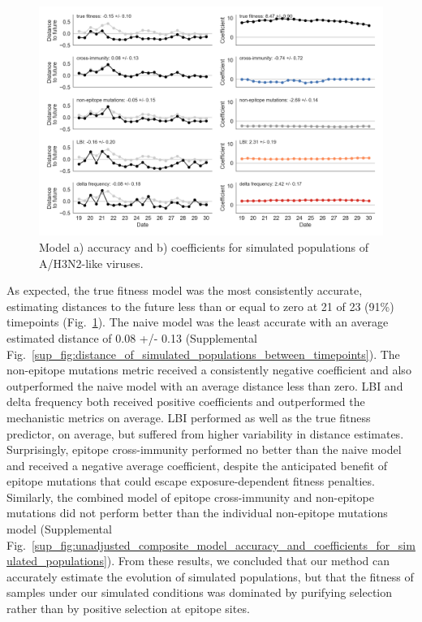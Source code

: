 \begin{figure}[t]
  \begin{center}
  \includegraphics[width=\textwidth]{figures/unadjusted-model-accuracy-and-coefficients-for-simulated-populations.png}
  \caption{Model a) accuracy and b) coefficients for simulated populations of A/H3N2-like viruses.}
  \label{fig:unadjusted_model_accuracy_and_coefficients_for_simulated_populations}
  \end{center}
\end{figure}

As expected, the true fitness model was the most consistently accurate, estimating distances to the future less than or equal to zero at 21 of 23 (91\%) timepoints (Fig.~\ref{fig:unadjusted_model_accuracy_and_coefficients_for_simulated_populations}).
The naive model was the least accurate with an average estimated distance of 0.08 +/- 0.13 (Supplemental Fig.~\ref{sup_fig:distance_of_simulated_populations_between_timepoints}).
The non-epitope mutations metric received a consistently negative coefficient and also outperformed the naive model with an average distance less than zero.
LBI and delta frequency both received positive coefficients and outperformed the mechanistic metrics on average.
LBI performed as well as the true fitness predictor, on average, but suffered from higher variability in distance estimates.
Surprisingly, epitope cross-immunity performed no better than the naive model and received a negative average coefficient, despite the anticipated benefit of epitope mutations that could escape exposure-dependent fitness penalties.
Similarly, the combined model of epitope cross-immunity and non-epitope mutations did not perform better than the individual non-epitope mutations model (Supplemental Fig.~\ref{sup_fig:unadjusted_composite_model_accuracy_and_coefficients_for_simulated_populations}).
From these results, we concluded that our method can accurately estimate the evolution of simulated populations, but that the fitness of samples under our simulated conditions was dominated by purifying selection rather than by positive selection at epitope sites.


